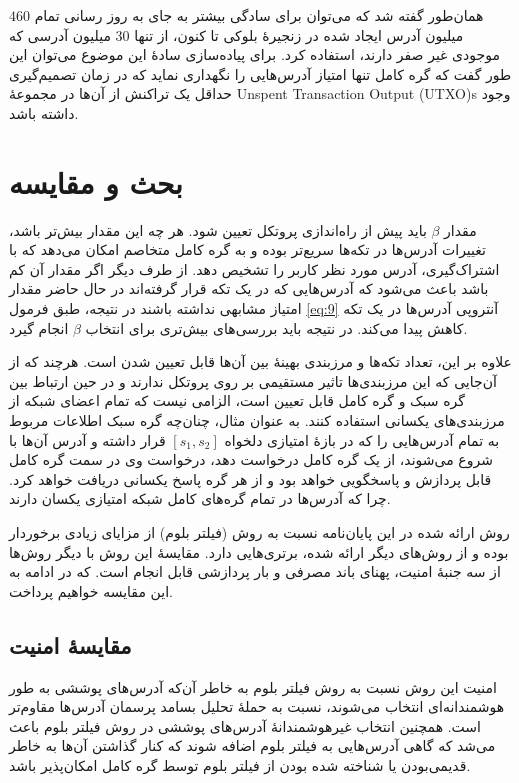 همان‌طور گفته شد که می‌توان برای سادگی بیشتر به جای به روز رسانی تمام $460$ میلیون آدرس ایجاد شده در زنجیرهٔ بلوکی تا کنون، از تنها $30$ میلیون آدرسی که موجودی غیر صفر دارند، استفاده کرد. برای پیاده‌سازی سادهٔ این موضوع می‌توان این طور گفت که گره کامل تنها امتیاز آدرس‌هایی را نگهداری نماید که در زمان تصمیم‌گیری حداقل یک تراکنش از آن‌ها در مجموعهٔ 
\glspl{Unspent Transaction Output (UTXO)}
وجود داشته باشد.



\section{بحث و مقایسه}


مقدار $\beta$ باید پیش از راه‌اندازی پروتکل تعیین شود. هر چه این مقدار بیش‌تر باشد، تغییرات آدرس‌ها در تکه‌ها سریع‌تر بوده و به گره کامل متخاصم امکان می‌دهد که با اشتراک‌گیری، آدرس مورد نظر کاربر را تشخیص دهد. از طرف دیگر اگر مقدار آن کم باشد باعث می‌شود که آدرس‌هایی که در یک تکه قرار گرفته‌اند در حال حاضر مقدار امتیاز مشابهی نداشته باشند در نتیجه، طبق فرمول \eqref{eq:9} آنتروپی آدرس‌ها در یک تکه کاهش پیدا می‌کند. در نتیجه باید بررسی‌های بیش‌تری برای انتخاب $\beta$ انجام گیرد. 

علاوه بر این، تعداد تکه‌ها و مرزبندی بهینهٔ بین آن‌ها قابل تعیین شدن است. هرچند که از آن‌جایی که این مرز‌بندی‌ها تاثیر مستقیمی بر روی پروتکل ندارند و در حین ارتباط بین گره سبک و گره کامل قابل تعیین است، الزامی نیست که تمام اعضای شبکه از مرز‌بندی‌های یکسانی استفاده کنند. به عنوان مثال، چنان‌چه گره سبک اطلاعات مربوط به تمام آدرس‌هایی را که در بازهٔ امتیازی دلخواه
$[s_1, s_2]$
قرار داشته و آدرس آن‌ها با  شروع می‌شوند، از یک گره کامل درخواست دهد، درخواست وی در سمت گره کامل قابل پردازش و پاسخگویی خواهد بود و از هر گره پاسخ یکسانی دریافت خواهد کرد. چرا که آدرس‌ها در تمام گره‌های کامل شبکه امتیازی یکسان دارند.

روش ارائه شده در این پایان‌نامه نسبت به روش  (فیلتر بلوم) از مزایای زیادی برخوردار بوده و از روش‌های دیگر ارائه شده،‌ برتری‌هایی دارد. مقایسهٔ این روش با دیگر روش‌ها از سه جنبهٔ امنیت، پهنای باند مصرفی و بار پردازشی قابل انجام است. که در ادامه به این مقایسه خواهیم پرداخت.

\subsection{مقایسهٔ امنیت}
امنیت این روش نسبت به روش فیلتر بلوم به خاطر آن‌که آدرس‌های پوششی به طور هوشمندانه‌ای انتخاب می‌شوند، نسبت به حملهٔ تحلیل بسامد پرسمان آدرس‌ها مقاوم‌تر است. همچنین انتخاب غیرهوشمندانهٔ آدرس‌های پوششی در روش فیلتر بلوم باعث می‌شد که گاهی آدرس‌هایی به  فیلتر بلوم اضافه شوند که کنار گذاشتن آن‌ها به خاطر قدیمی‌بودن یا شناخته شده بودن از فیلتر بلوم توسط گره کامل امکان‌پذیر باشد.

